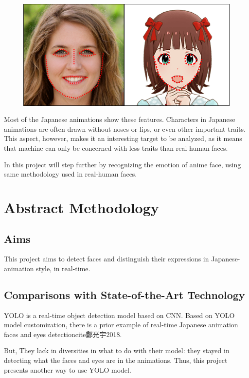\documentclass{article}
\begin{document}
\begin{figure}[h]
    \centering
    \includegraphics{featured_compare.png}
\end{figure}

Most of the Japanese animations show these features. Characters in Japanese animations are often drawn without noses or lips, or even other important traits. This aspect, however, makes it an interesting target to be analyzed, as it means that machine can only be concerned with less traits than real-human faces.

In this project will step further by recognizing the emotion of anime face, using same methodology used in real-human faces.


\section{Abstract Methodology}

\subsection{Aims}

This project aims to detect faces and distinguish their expressions in Japanese-animation style, in real-time.

\subsection{Comparisons with State-of-the-Art Technology}

YOLO is a real-time object detection model based on CNN.
Based on YOLO model customization, there is a prior example of real-time Japanese animation faces and eyes detectioncite{鄭光宇2018}.

But, They lack in diversities in what to do with their model: they stayed in detecting what the faces and eyes are in the animations.
Thus, this project presents another way to use YOLO model.
\end{document}
